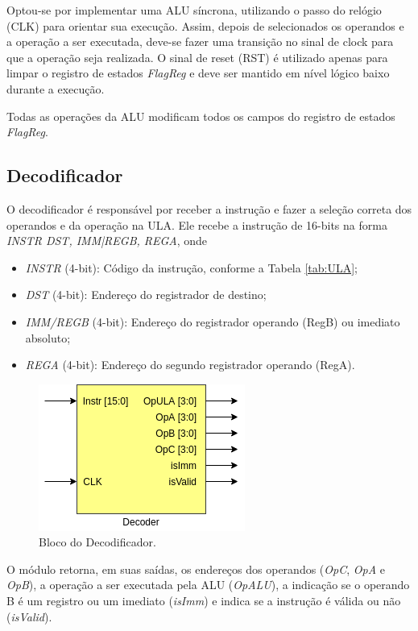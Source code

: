 \documentclass[11pt,a4paper,titlepage]{article}
\begin{document}
Optou-se por implementar uma ALU síncrona, utilizando o passo do relógio (CLK) para orientar sua execução. Assim, depois de selecionados os operandos e a operação a ser executada, deve-se fazer uma transição no sinal de clock para que a operação seja realizada. O sinal de reset (RST) é utilizado apenas para limpar o registro de estados \textit{FlagReg} e deve ser mantido em nível lógico baixo durante a execução.

Todas as operações da ALU modificam todos os campos do registro de estados \textit{FlagReg}.

\subsection{Decodificador}\label{subsec:decode}

O decodificador é responsável por receber a instrução e fazer a seleção correta dos operandos e da operação na ULA. Ele recebe a instrução de 16-bits na forma \textit{INSTR DST, IMM|REGB, REGA}, onde

\begin{itemize}
\item \textit{INSTR} (4-bit): Código da instrução, conforme a Tabela \ref{tab:ULA};
\item \textit{DST} (4-bit): Endereço do registrador de destino;
\item \textit{IMM/REGB} (4-bit): Endereço do registrador operando (RegB) ou imediato absoluto;
\item \textit{REGA} (4-bit): Endereço do segundo registrador operando (RegA).
\end{itemize}

\begin{figure}[h]
\centering
\includegraphics[scale=0.5]{images/Decoder.png}
\caption{Bloco do Decodificador.}
\label{fig:blocodecoder}
\end{figure}

O módulo retorna, em suas saídas, os endereços dos operandos (\textit{OpC}, \textit{OpA} e \textit{OpB}), a operação a ser executada pela ALU (\textit{OpALU}), a indicação se o operando B é um registro ou um imediato (\textit{isImm}) e indica se a instrução é válida ou não (\textit{isValid}).
\end{document}
